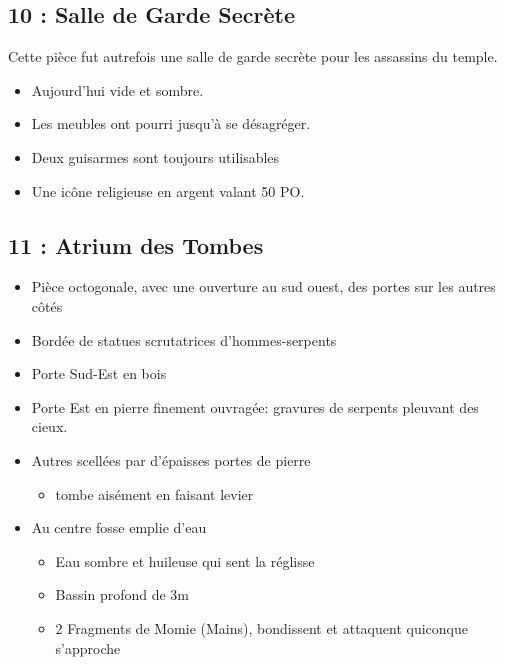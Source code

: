 \vfill\break
\subsection{10 : Salle de Garde Secrète}\label{n2:s10}
Cette pièce fut autrefois une salle de garde secrète pour
les assassins du temple.

\begin{itemize}
  \item Aujourd'hui vide et sombre.
  \item Les meubles ont pourri jusqu’à se désagréger.
  \item Deux guisarmes sont toujours utilisables
  \item Une icône religieuse en argent valant 50 PO.
\end{itemize}

\newpage

\subsection{11 : Atrium des Tombes}\label{n2:s11}
\begin{itemize}
    \item Pièce octogonale, avec une ouverture au sud ouest, des portes sur les autres côtés
    \item Bordée de statues scrutatrices d’hommes-serpents
    \item Porte Sud-Est en bois
    \item Porte Est en pierre finement ouvragée: gravures de serpents pleuvant des cieux.
    \item Autres scellées par d’épaisses portes de pierre
    \begin{itemize}
        \item tombe aisément en faisant levier
    \end{itemize}
    \item Au centre fosse emplie d'eau
    \begin{itemize}
        \item Eau sombre et huileuse qui sent la réglisse
        \item Bassin profond de 3m
        \item 2 Fragments de Momie (Mains), bondissent et attaquent quiconque s’approche
    \end{itemize}
\end{itemize}

